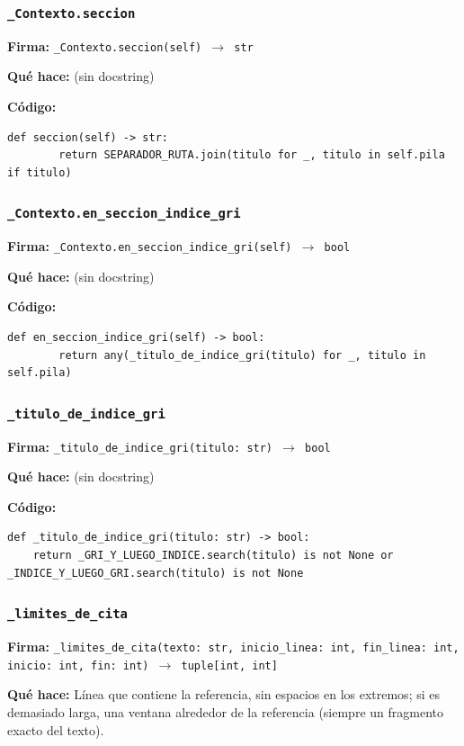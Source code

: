 \documentclass[11pt,a4paper]{article}
\begin{document}
\subsubsection*{\texttt{\_Contexto.seccion}}
\textbf{Firma:} \texttt{\_Contexto.seccion(self) $\rightarrow$ str}

\textbf{Qué hace:} (sin docstring)

\textbf{Código:}
\begin{lstlisting}
def seccion(self) -> str:
        return SEPARADOR_RUTA.join(titulo for _, titulo in self.pila if titulo)
\end{lstlisting}

\subsubsection*{\texttt{\_Contexto.en\_seccion\_indice\_gri}}
\textbf{Firma:} \texttt{\_Contexto.en\_seccion\_indice\_gri(self) $\rightarrow$ bool}

\textbf{Qué hace:} (sin docstring)

\textbf{Código:}
\begin{lstlisting}
def en_seccion_indice_gri(self) -> bool:
        return any(_titulo_de_indice_gri(titulo) for _, titulo in self.pila)
\end{lstlisting}

\subsubsection*{\texttt{\_titulo\_de\_indice\_gri}}
\textbf{Firma:} \texttt{\_titulo\_de\_indice\_gri(titulo: str) $\rightarrow$ bool}

\textbf{Qué hace:} (sin docstring)

\textbf{Código:}
\begin{lstlisting}
def _titulo_de_indice_gri(titulo: str) -> bool:
    return _GRI_Y_LUEGO_INDICE.search(titulo) is not None or _INDICE_Y_LUEGO_GRI.search(titulo) is not None
\end{lstlisting}

\subsubsection*{\texttt{\_limites\_de\_cita}}
\textbf{Firma:} \texttt{\_limites\_de\_cita(texto: str, inicio\_linea: int, fin\_linea: int, inicio: int, fin: int) $\rightarrow$ tuple[int, int]}

\textbf{Qué hace:} Línea que contiene la referencia, sin espacios en los extremos; si es
demasiado larga, una ventana alrededor de la referencia (siempre un fragmento
exacto del texto).
\end{document}

